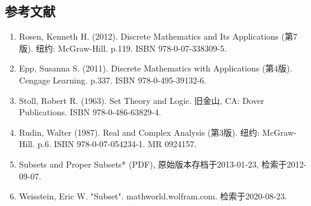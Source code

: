\subsection{参考文献}
\begin{enumerate}
\item Rosen, Kenneth H. (2012). Discrete Mathematics and Its Applications (第7版). 纽约: McGraw-Hill. p.119. ISBN 978-0-07-338309-5.
\item Epp, Susanna S. (2011). Discrete Mathematics with Applications (第4版). Cengage Learning. p.337. ISBN 978-0-495-39132-6.
\item Stoll, Robert R. (1963). Set Theory and Logic. 旧金山, CA: Dover Publications. ISBN 978-0-486-63829-4.
\item Rudin, Walter (1987). Real and Complex Analysis (第3版). 纽约: McGraw-Hill. p.6. ISBN 978-0-07-054234-1. MR 0924157.
\item Subsets and Proper Subsets* (PDF), 原始版本存档于2013-01-23, 检索于2012-09-07.
\item Weisstein, Eric W. "Subset". mathworld.wolfram.com. 检索于2020-08-23.
\end{enumerate}

